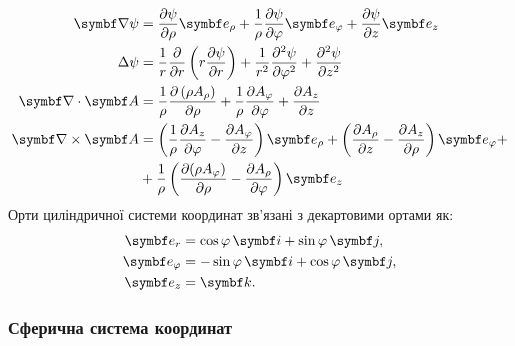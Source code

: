 \begin{align}\label{cylindric}
		\vect{\nabla}\psi & = \frac{\partial \psi}{\partial \rho} \vect{e}_{\rho} + \frac{1}{\rho}\frac{\partial \psi}{\partial \phi} \vect{e}_{\phi} + \frac{\partial \psi}{\partial z} \vect{e}_{z}                                                                                       \\
	\Laplasian\psi    & = \frac{1}{r} \frac{\partial }{\partial r} \left( r \frac{\partial \psi}{\partial r} \right) + \frac{1}{r^2} \frac{\partial^2 \psi}{\partial \phi^2} + \frac{\partial^2 \psi}{\partial z^2}                                                                   \\
	\divg\vect{A}     & = \frac{1}{\rho}\frac{\partial \left(\rho A_{\rho }\right)}{\partial \rho }+\frac{1}{\rho }\frac{\partial A_{\phi } }{\partial \phi }+\frac{\partial A_{z}}{\partial z}                                                                                    \\
	\rot\vect{A}      & =\left({\frac {1}{\rho }}{\frac {\partial A_{z}}{\partial \phi }}-{\frac {\partial A_{\phi }}{\partial z}}\right)\vect{e}_{\rho}+\left({\frac {\partial A_{\rho }}{\partial z}}-{\frac {\partial A_{z}}{\partial \rho }}\right)\vect{e}_{\phi} + \nonumber \\
	                  & +
	{\frac {1}{\rho }}\left({\frac {\partial (\rho A_{\phi })}{\partial \rho }}-{\frac {\partial A_{\rho }}{\partial \phi }}\right)\vect{e}_{z}
\end{align}
Орти циліндричної системи координат зв'язані з декартовими ортами як:
\begin{align}\label{}
    \vect{e}_r &= \cos\phi\, \vect{i} + \sin\phi\, \vect{j}, \\
    \vect{e}_{\phi} &= -\sin\phi\, \vect{i} + \cos\phi\, \vect{j}, \\
    \vect{e}_{z} &= \vect{k}.
\end{align}

\subsubsection{Сферична система координат}

